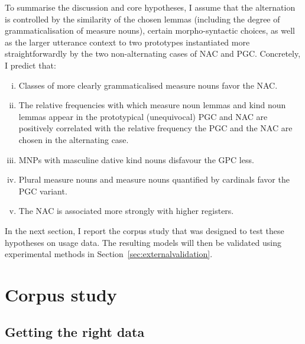 \documentclass[USenglish]{article}
\begin{document}
To summarise the discussion and core hypotheses, I assume that the alternation is controlled by the similarity of the chosen lemmas (including the degree of grammaticalisation of measure nouns), certain morpho-syntactic choices, as well as the larger utterance context to two prototypes instantiated more straightforwardly by the two non-alternating cases of NAC and PGC.
Concretely, I predict that:

\begin{enumerate}[i.]
  \item Classes of more clearly grammaticalised measure nouns favor the NAC.
  \item The relative frequencies with which measure noun lemmas and kind noun lemmas appear in the prototypical (unequivocal) PGC and NAC are positively correlated with the relative frequency the PGC and the NAC are chosen in the alternating case.
  \item MNPs with masculine dative kind nouns disfavour the GPC less.
  \item Plural measure nouns and measure nouns quantified by cardinals favor the PGC variant.
  \item The NAC is associated more strongly with higher registers.
\end{enumerate}

\vspace{-1\baselineskip}

In the next section, I report the corpus study that was designed to test these hypotheses on usage data.
The resulting models will then be validated using experimental methods in Section~\ref{sec:externalvalidation}.





\section{Corpus study}
\label{sec:corpusstudies}


\subsection{Getting the right data}
\label{sec:gettingdata}

\end{document}

